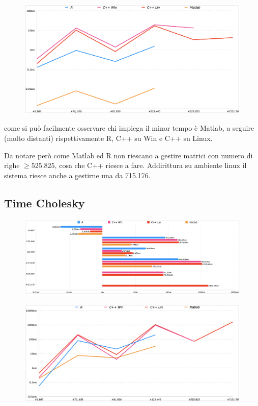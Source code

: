 \documentclass[preprint,12pt]{elsarticle}
\begin{document}
\begin{figure}[H]
	\centering
	\includegraphics[width=\linewidth]{setup2}
\end{figure}

come si può facilmente osservare chi impiega il minor tempo è Matlab, a seguire (molto distanti) rispettivamente R, C++ su Win e C++ su Linux.


Da notare però come Matlab ed R non riescano a gestire matrici con numero di righe $\geq 525.825$, cosa che C++ riesce a fare. Addirittura su ambiente linux il sistema riesce anche a gestirne una da 715.176.

\subsection{Time Cholesky}

\begin{figure}[H]
	\centering
	\includegraphics[width=\linewidth]{cholesky1}
\end{figure}

\begin{figure}[H]
	\centering
	\includegraphics[width=\linewidth]{cholesky2}
\end{figure}
\end{document}
